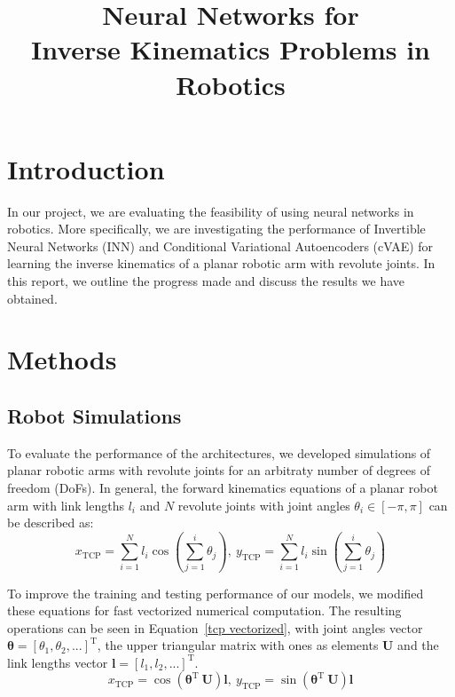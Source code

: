\documentclass[conference]{IEEEtran}
\begin{document}
\title{Neural Networks for \\Inverse Kinematics Problems in Robotics}

\author{
    \and
}

\maketitle

\section*{Introduction}

In our project, we are evaluating the feasibility of using neural networks in robotics. More specifically, we are investigating the performance of Invertible Neural Networks (INN) and Conditional Variational Autoencoders (cVAE) for learning the inverse kinematics of a planar robotic arm with revolute joints. In this report, we outline the progress made and discuss the results we have obtained.

\section*{Methods}
\subsection*{Robot Simulations}

To evaluate the performance of the architectures, we developed simulations of planar robotic arms with revolute joints for an arbitraty number of degrees of freedom (DoFs). In general, the forward kinematics equations of a planar robot arm with link lengths \( l_i \) and \( N \) revolute joints with joint angles \( \theta_i \in [-\pi, \pi] \) can be described as:
\begin{equation}
    x_\text{TCP} = \sum_{i=1}^{N}{l_i \cos\left( \sum_{j=1}^{i}{\theta_j} \right)}, \ 
    y_\text{TCP} = \sum_{i=1}^{N}{l_i \sin\left( \sum_{j=1}^{i}{\theta_j} \right)}
\end{equation}

To improve the training and testing performance of our models, we modified these equations for fast vectorized numerical computation. The resulting operations can be seen in Equation~\ref{tcp vectorized}, with joint angles vector \( \bm{\theta} = \left[ \theta_1, \theta_2 , ... \right]^\text{T} \), the upper triangular matrix with ones as elements \( \bm{U} \) and the link lengths vector \( \bm{l} = \left[ l_1, l_2, ... \right]^\text{T} \).
\begin{equation}
    x_\text{TCP} = \cos \left( \bm{\theta}^\text{T}\ \bm{U} \right) \bm{l}, \ 
    y_\text{TCP} = \sin \left( \bm{\theta}^\text{T}\ \bm{U} \right) \bm{l}
    \label{tcp vectorized}
\end{equation}
\end{document}
